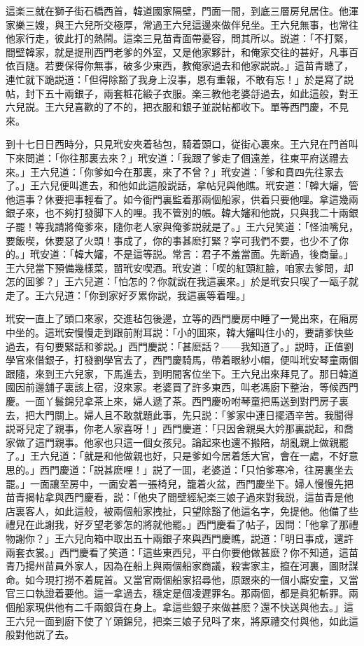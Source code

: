 這楽三就在獅子街石橋西首，韓道國家隔壁，門面一間，到底三層房兒居住。他渾家樂三嫂，與王六兒所交極厚，常過王六兒這邊來做伴兒坐。王六兒無事，也常往他家行走，彼此打的熱鬧。這楽三見苗青面帶憂容，問其所以。説道：「不打緊，間壁韓家，就是提刑西門老爹的外室，又是他家夥計，和俺家交往的甚好，凡事百依百隨。若要保得你無事，破多少東西，教俺家過去和他家説説。」這苗青聽了，連忙就下跪説道：「但得除豁了我身上沒事，恩有重報，不敢有忘！」於是寫了説帖，封下五十兩銀子，兩套粧花緞子衣服。楽三教他老婆㧱過去，如此這般，對王六兒説。王六兒喜歡的了不的，把衣服和銀子並説帖都收下。單等西門慶，不見來。

到十七日日西時分，只見玳安夾着毡包，騎着頭口，従街心裏來。王六兒在門首叫下來問道：「你往那裏去來？」玳安道：「我跟了爹走了個遠差，往東平府送禮去來。」王六兒道：「你爹如今在那裏，來了不曾？」玳安道：「爹和賁四先往家去了。」王六兒便叫進去，和他如此這般説話，拿帖兒與他瞧。玳安道：「韓大嬸，管他這事？休要把事輕看了。如今衙門裏監着那兩個船家，供着只要他哩。拿這幾兩銀子來，也不夠打發脚下人的哩。我不管別的帳。韓大嬸和他説，只與我二十兩銀子罷！等我請將俺爹來，隨你老人家與俺爹説就是了。」王六兒笑道：「怪油嘴兒，要飯喫，休要惡了火頭！事成了，你的事甚麽打緊？寜可我們不要，也少不了你的。」玳安道：「韓大嬸，不是這等説。常言：君子不羞當面。先断過，後商量。」王六兒當下預備幾樣菜，㽞玳安喫酒。玳安道：「喫的紅頭紅臉，咱家去爹問，却怎的囬爹？」王六兒道：「怕怎的？你就説在我這裏來。」於是玳安只喫了一甌子就走了。王六兒道：「你到家好歹累你説，我這裏等着哩。」

玳安一直上了頭口來家，交進毡包後邊，立等的西門慶房中睡了一覺出來，在廂房中坐的。這玳安慢慢走到跟前附耳説：「小的囬來，韓大嬸叫住小的，要請爹快些過去，有句要緊話和爹説。」西門慶説：「甚麽話？——我知道了。」説時，正值劉學官來借銀子，打發劉學官去了，西門慶騎馬，帶着眼紗小帽，便叫玳安琴童兩個跟隨，來到王六兒家，下馬進去，到明間客位坐下。王六兒出來拜見了。那日韓道國因前邊舖子裏該上宿，沒來家。老婆買了許多東西，叫老馮廚下整治，等候西門慶。一面丫鬟錦兒拿茶上來，婦人遞了茶。西門慶吩咐琴童把馬送到對門房子裏去，把大門關上。婦人且不敢就題此事，先只説：「爹家中連日擺酒辛苦。我聞得説哥兒定了親事，你老人家喜呀！」西門慶道：「只因舍親吳大妗那裏説起，和喬家做了這門親事。他家也只這一個女孩兒。論起來也還不搬陪，胡亂親上做親罷了。」王六兒道：「就是和他做親也好，只是爹如今居着恁大官，會在一處，不好意思的。」西門慶道：「説甚麽哩！」説了一囬，老婆道：「只怕爹寒冷，往房裏坐去罷。」一面讓至房中，一面安着一張椅兒，籠着火盆，西門慶坐下。婦人慢慢先把苗青揭帖拿與西門慶看，説：「他央了間壁經紀楽三娘子過來對我説，這苗青是他店裏客人，如此這般，被兩個船家拽扯，只望除豁了他這名字，免提他。他備了些禮兒在此謝我，好歹望老爹怎的將就他罷。」西門慶看了帖子，因問：「他拿了那禮物謝你？」王六兒向箱中取出五十兩銀子來與西門慶瞧，説道：「明日事成，還許兩套衣裳。」西門慶看了笑道：「這些東西兒，平白你要他做甚麽？你不知道，這苗青乃揚州苗員外家人，因為在船上與兩個船家商議，殺害家主，攛在河裏，圖財謀命。如今現打撈不着屍首。又當官兩個船家招尋他，原跟來的一個小廝安童，又當官三口執證着要他。這一拿過去，穩定是個凌遲罪名。那兩個，都是眞犯斬罪。兩個船家現供他有二千兩銀貨在身上。拿這些銀子來做甚麽？還不快送與他去。」這王六兒一面到廚下使了丫頭錦兒，把楽三娘子兒呌了來，將原禮交付與他，如此這般對他説了去。

